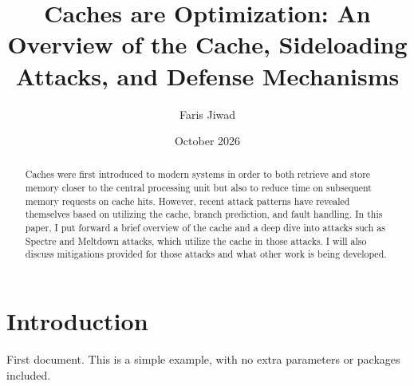 \documentclass{article}
\title{Caches are Optimization: An Overview of the Cache, Sideloading Attacks, and Defense Mechanisms}
\author{Faris Jiwad}
\date{October 2026}
\begin{document}
\maketitle
\begin{abstract}
    Caches were first introduced to modern systems in order to both retrieve and store memory closer to the central processing unit but also to reduce time on subsequent memory requests on cache hits. However, recent attack patterns have revealed themselves based on utilizing the cache, branch prediction, and fault handling. 
    In this paper, I put forward a brief overview of the cache and a deep dive into attacks such as Spectre and Meltdown attacks, which utilize the cache in those attacks. I will also discuss mitigations provided for those attacks and what other work is being developed. 
\end{abstract}
\section{Introduction}
First document. This is a simple example, with no 
extra parameters or packages included.
\end{document}

